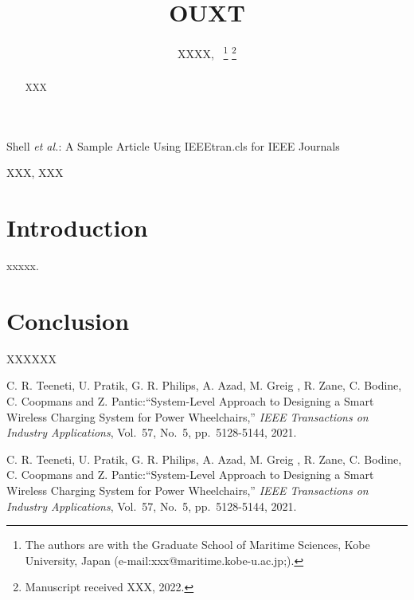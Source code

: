 \documentclass[lettersize,journal]{IEEEtran}
\begin{document}
\title{OUXT
}
\author{XXXX,~
\thanks{
The authors are with the Graduate School of Maritime Sciences,
Kobe University, Japan
(e-mail:xxx@maritime.kobe-u.ac.jp;).
}%
\thanks{Manuscript received XXX, 2022.}
}

%
{Shell \MakeLowercase{\textit{et al.}}: A Sample Article Using IEEEtran.cls for IEEE Journals}


\maketitle

\begin{abstract}
XXX
\end{abstract}

\begin{IEEEkeywords}
XXX, XXX
\end{IEEEkeywords}

\section{Introduction}
 xxxxx.

\section{Conclusion}
XXXXXX
\begin{thebibliography}{1}


    C. R. Teeneti, U. Pratik, G. R. Philips, A. Azad, M. Greig , R. Zane, C. Bodine, C. Coopmans and Z. Pantic:``System-Level Approach to Designing a Smart Wireless Charging System for Power Wheelchairs,'' {\it IEEE Transactions on Industry Applications}, Vol.~57, No.~5, pp.~5128-5144, 2021.

    C. R. Teeneti, U. Pratik, G. R. Philips, A. Azad, M. Greig , R. Zane, C. Bodine, C. Coopmans and Z. Pantic:``System-Level Approach to Designing a Smart Wireless Charging System for Power Wheelchairs,'' {\it IEEE Transactions on Industry Applications}, Vol.~57, No.~5, pp.~5128-5144, 2021.

\end{thebibliography}

\vfill
\end{document}
